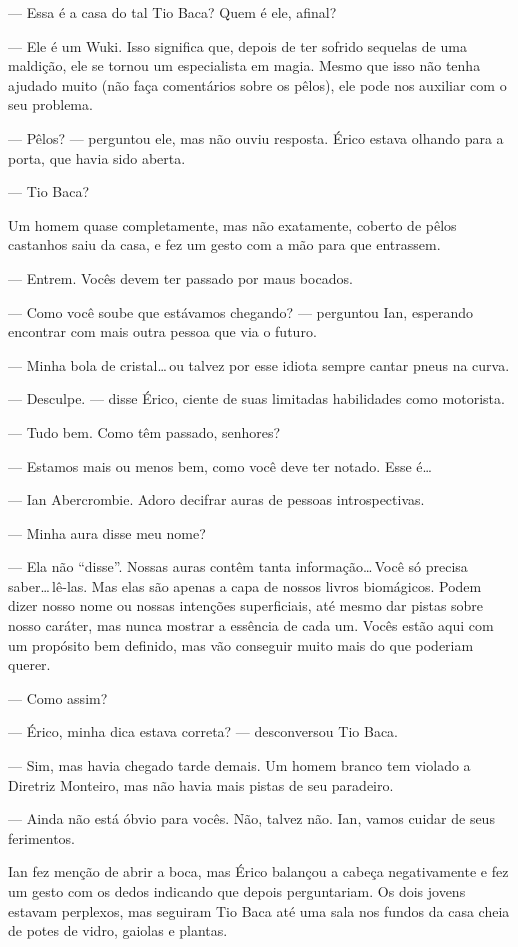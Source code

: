 --- Essa é a casa do tal Tio Baca? Quem é ele, afinal?

--- Ele é um Wuki. Isso significa que, depois de ter sofrido sequelas de uma
maldição, ele se tornou um especialista em magia. Mesmo que isso não tenha
ajudado muito (não faça comentários sobre os pêlos), ele pode nos auxiliar com
o seu problema.

--- Pêlos? --- perguntou ele, mas não ouviu resposta. Érico estava olhando para
a porta, que havia sido aberta.

--- Tio Baca?

Um homem quase completamente, mas não exatamente, coberto de pêlos castanhos
saiu da casa, e fez um gesto com a mão para que entrassem.

--- Entrem. Vocês devem ter passado por maus bocados.

--- Como você soube que estávamos chegando? --- perguntou Ian, esperando
encontrar com mais outra pessoa que via o futuro.

--- Minha bola de cristal\ldots\,ou talvez por esse idiota sempre cantar pneus
na curva.

--- Desculpe. --- disse Érico, ciente de suas limitadas habilidades como
motorista.

--- Tudo bem. Como têm passado, senhores?

--- Estamos mais ou menos bem, como você deve ter notado. Esse é\ldots

--- Ian Abercrombie. Adoro decifrar auras de pessoas introspectivas.

--- Minha aura disse meu nome?

--- Ela não “disse”. Nossas auras contêm tanta informação\ldots\,Você só
precisa saber\ldots\,lê-las. Mas elas são apenas a capa de nossos livros
biomágicos. Podem dizer nosso nome ou nossas intenções superficiais, até mesmo
dar pistas sobre nosso caráter, mas nunca mostrar a essência de cada um. Vocês
estão aqui com um propósito bem definido, mas vão conseguir muito mais do que
poderiam querer.

--- Como assim?

--- Érico, minha dica estava correta? --- desconversou Tio Baca.

--- Sim, mas havia chegado tarde demais. Um homem branco tem violado a Diretriz
Monteiro, mas não havia mais pistas de seu paradeiro.

--- Ainda não está óbvio para vocês. Não, talvez não. Ian, vamos cuidar de seus
ferimentos.

Ian fez menção de abrir a boca, mas Érico balançou a cabeça negativamente e fez
um gesto com os dedos indicando que depois perguntariam. Os dois jovens estavam
perplexos, mas seguiram Tio Baca até uma sala nos fundos da casa cheia de potes
de vidro, gaiolas e plantas.

